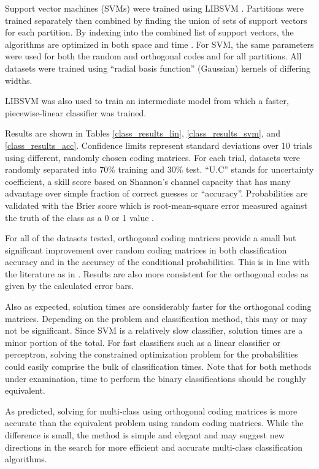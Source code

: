 Support vector machines (SVMs) were trained using
LIBSVM \citep{Chang_Lin2011}.
Partitions were trained separately then combined by finding the union of
sets of support vectors for each partition.
By indexing into the combined list of support vectors, the algorithms are
optimized in both space and time \citep{Chang_Lin2011}.
For SVM, the same parameters were used for both the random and orthogonal codes and 
for all partitions.
All datasets were trained using  ``radial basis function'' (Gaussian)
kernels of differing widths.

LIBSVM was also used to train an intermediate model from which a faster,
piecewise-linear classifier was trained.

Results are shown in Tables \ref{class_results_lin}, \ref{class_results_svm},
and \ref{class_results_acc}.
Confidence limits represent standard deviations over 10 trials using
different, randomly chosen coding matrices.
For each trial, datasets were randomly separated into 70\% training and 30\%
test.
``U.C'' stands for uncertainty
coefficient, a skill score based on Shannon's channel capacity
\citep{Shannon,Press_etal1992,Mills2011} that has many advantage over simple
fraction of correct guesses or ``accuracy''.
Probabilities are validated with the Brier score 
which is root-mean-square
error measured against the truth of the class as a 0 or 1 value
\citep{Brier1950,Jolliffe_Stephenson2003}.

For all of the datasets tested, orthogonal coding matrices provide a small but
significant improvement over random coding matrices in both classification
accuracy and in the accuracy of the conditional probabilities.
This is in line with the literature as in \citet{Dietterich_Bakiri1995,Windeatt_Ghaderi2002}.
Results are also more consistent for the orthogonal codes as given by the
calculated error bars.

Also as expected, solution times are
considerably faster for the orthogonal coding matrices.
Depending on the problem and classification method, this may or may not
be significant.
Since SVM is a relatively slow classifier, solution times
are a minor portion of the total.
For fast classifiers such as a linear classifier or perceptron,
solving the constrained optimization problem for the probabilities
could easily comprise the bulk of classification times.
Note that for both methods under examination, time to perform the binary
classifications should be roughly equivalent.

As predicted, solving for multi-class using orthogonal coding matrices 
is more accurate than the equivalent problem using random coding matrices.
While the difference is small,
the method is simple and elegant and
may suggest new directions in the search for more efficient and
accurate multi-class classification algorithms.

